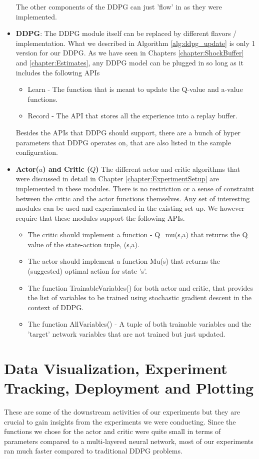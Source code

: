 \begin{itemize}
\begin{itemize}
     \end{itemize} The other components of the DDPG can just 'flow' in as they were implemented.
     \item \textbf{DDPG}: 
     The DDPG module itself can be replaced by different flavors / implementation. What we described in Algorithm \ref{alg:ddpg_update} is only 1 version for our DDPG. As we have seen in Chapters \ref{chapter:ShockBuffer} and \ref{chapter:Estimates}, any DDPG model can be plugged in so long as it includes the following APIs
    \begin{itemize}
        \item Learn - The function that is meant to update the Q-value and a-value functions. 
        \item Record - The API that stores all the experience into a replay buffer.
    \end{itemize}
    Besides the APIs that DDPG should support, there are a bunch of hyper parameters that DDPG operates on, that are also listed in the sample configuration.
    \item \textbf{Actor($a$) and Critic ($Q$)}
        The different actor and critic algorithms that were discussed in detail in Chapter \ref{chapter:ExperimentSetup} are implemented in these modules. There is no restriction or a sense of constraint between the critic and the actor functions themselves. Any set of interesting modules can be used and experimented in the existing set up.
        We however require that these modules support the following APIs.
        \begin{itemize}
            \item The critic  should implement a function - Q\_mu(s,a) that returns the Q value of the state-action tuple, (s,a).
            \item The actor  should implement a function Mu(s) that returns the (suggested) optimal action for state 's'.
            \item The function TrainableVariables() for both actor and critic, that provides the list of variables to be trained using stochastic gradient descent in the context of DDPG.
            \item The function AllVariables() - A tuple of both trainable variables and the 'target' network variables that are not trained but just updated.
        \end{itemize}
 \end{itemize}
\section{Data Visualization, Experiment Tracking, Deployment and Plotting}
These are some of the downstream activities of our experiments but they are crucial to gain insights from the experiments we were conducting. Since the functions we chose for the actor and critic were quite small in terms of parameters compared to a multi-layered neural network, most of our experiments ran much faster compared to traditional DDPG problems.

